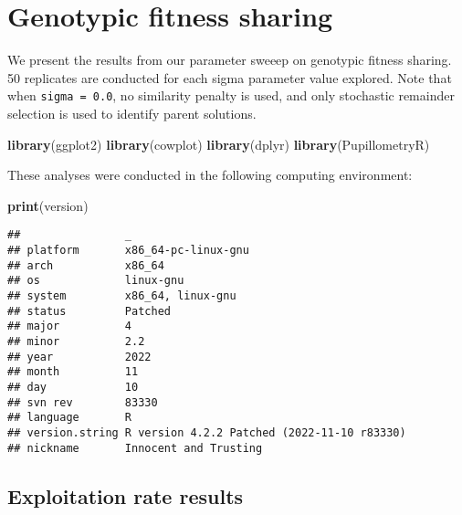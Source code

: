 \documentclass[]{book}
\newenvironment{Shaded}{\begin{snugshade}}{\end{snugshade}}
\newcommand{\KeywordTok}[1]{\textcolor[rgb]{0.13,0.29,0.53}{\textbf{#1}}}
\newcommand{\NormalTok}[1]{#1}
\begin{document}
\hypertarget{genotypic-fitness-sharing}{%
\chapter{Genotypic fitness sharing}\label{genotypic-fitness-sharing}}

We present the results from our parameter sweeep on genotypic fitness sharing.
50 replicates are conducted for each sigma parameter value explored.
Note that when \texttt{sigma\ =\ 0.0}, no similarity penalty is used, and only stochastic remainder selection is used to identify parent solutions.

\begin{Shaded}
\begin{Highlighting}[]
\KeywordTok{library}\NormalTok{(ggplot2)}
\KeywordTok{library}\NormalTok{(cowplot)}
\KeywordTok{library}\NormalTok{(dplyr)}
\KeywordTok{library}\NormalTok{(PupillometryR)}
\end{Highlighting}
\end{Shaded}

These analyses were conducted in the following computing environment:

\begin{Shaded}
\begin{Highlighting}[]
\KeywordTok{print}\NormalTok{(version)}
\end{Highlighting}
\end{Shaded}

\begin{verbatim}
##                _                                          
## platform       x86_64-pc-linux-gnu                        
## arch           x86_64                                     
## os             linux-gnu                                  
## system         x86_64, linux-gnu                          
## status         Patched                                    
## major          4                                          
## minor          2.2                                        
## year           2022                                       
## month          11                                         
## day            10                                         
## svn rev        83330                                      
## language       R                                          
## version.string R version 4.2.2 Patched (2022-11-10 r83330)
## nickname       Innocent and Trusting
\end{verbatim}

\hypertarget{exploitation-rate-results-3}{%
\section{Exploitation rate results}\label{exploitation-rate-results-3}}
\end{document}
